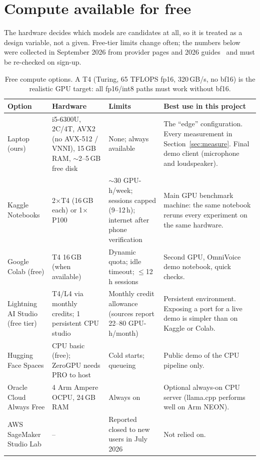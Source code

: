 \section{Compute available for free}
\label{sec:compute}

The hardware decides which models are candidates at all, so it is treated as a design variable, not a
given. Free-tier limits change often; the numbers below were collected in September 2026 from
provider pages and 2026 guides~\cite{kagglegpu,colabfaq,lightningfree} and must be re-checked on
sign-up.

\begin{table}[H]
\centering\small
\begin{tabularx}{\textwidth}{@{}L{2.7cm}L{3.4cm}L{3.3cm}Y@{}}
\toprule
\textbf{Option} & \textbf{Hardware} & \textbf{Limits} & \textbf{Best use in this project} \\
\midrule
Laptop (ours) & i5-6300U, 2C/4T, AVX2 (no AVX-512 / VNNI), 15\,GB RAM, $\sim$2–5\,GB free disk & None; always available & The ``edge'' configuration. Every measurement in Section~\ref{sec:measure}. Final demo client (microphone and loudspeaker). \\
Kaggle Notebooks & 2$\times$T4 (16\,GB each) or 1$\times$P100 & $\sim$30 GPU-h/week; sessions capped (9–12\,h); internet after phone verification & Main GPU benchmark machine: the same notebook reruns every experiment on the same hardware. \\
Google Colab (free) & T4 16\,GB (when available) & Dynamic quota; idle timeout; $\le$12\,h sessions & Second GPU, OmniVoice demo notebook, quick checks. \\
Lightning AI Studio (free tier) & T4/L4 via monthly credits; 1 persistent CPU studio & Monthly credit allowance (sources report 22–80 GPU-h/month) & Persistent environment. Exposing a port for a live demo is simpler than on Kaggle or Colab. \\
Hugging Face Spaces & CPU basic (free); ZeroGPU needs PRO to host & Cold starts; queueing & Public demo of the CPU pipeline only. \\
Oracle Cloud Always Free & 4 Arm Ampere OCPU, 24\,GB RAM & Always on & Optional always-on CPU server (llama.cpp performs well on Arm NEON). \\
AWS SageMaker Studio Lab & – & Reported closed to new users in July 2026 & Not relied on. \\
\bottomrule
\end{tabularx}
\caption{Free compute options. A T4 (Turing, 65 TFLOPS fp16, 320\,GB/s, no bf16) is the realistic
GPU target: all fp16/int8 paths must work without bf16.}
\label{tab:compute}
\end{table}

